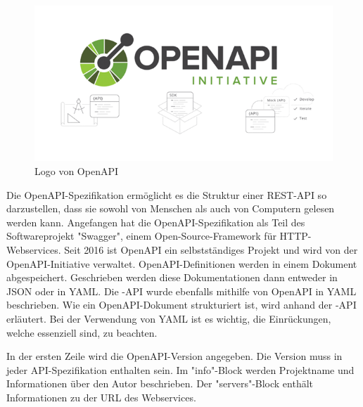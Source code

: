 \begin{figure}[H]
    \includegraphics{media/OpenAPI/Logo.png}
    \centering
    \caption{Logo von OpenAPI \cite{OpenAPI}}
\end{figure}


Die OpenAPI-Spezifikation ermöglicht es die Struktur einer REST-API so darzustellen, dass sie sowohl von Menschen als auch von Computern gelesen werden kann. Angefangen hat die OpenAPI-Spezifikation als Teil des Softwareprojekt "Swagger", einem Open-Source-Framework für HTTP-Webservices. Seit 2016 ist OpenAPI ein selbstständiges Projekt und wird von der OpenAPI-Initiative verwaltet. OpenAPI-Definitionen werden in einem Dokument abgespeichert. Geschrieben werden diese Dokumentationen dann entweder in JSON oder in YAML. Die \ZELIA-API wurde ebenfalls mithilfe von OpenAPI in YAML beschrieben. Wie ein OpenAPI-Dokument strukturiert ist, wird anhand der \ZELIA-API erläutert. Bei der Verwendung von YAML ist es wichtig, die Einrückungen, welche essenziell sind, zu beachten.



In der ersten Zeile wird die OpenAPI-Version angegeben. Die Version muss in jeder API-Spezifikation enthalten sein. Im "info"-Block werden Projektname und Informationen über den Autor beschrieben. Der "servers"-Block enthält Informationen zu der URL des Webservices. \cite{OpenAPI}


